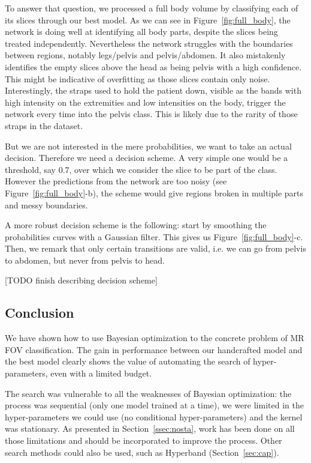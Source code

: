 To answer that question, we processed a full body volume by classifying each of its slices through our best model. 
As we can see in Figure~\ref{fig:full_body}, the network is doing well at identifying all body parts, despite the slices being treated independently. Nevertheless the network struggles with the boundaries between regions, notably legs/pelvis and pelvis/abdomen. It also mistakenly identifies the empty slices above the head as being pelvis with a high confidence. This might be indicative of overfitting as those slices contain only noise. Interestingly, the straps used to hold the patient down, visible as the bands with high intensity on the extremities and low intensities on the body, trigger the network every time into the pelvis class. This is likely due to the rarity of those straps in the dataset.

But we are not interested in the mere probabilities, we want to take an actual decision. Therefore we need a decision scheme. A very simple one would be a threshold, say $0.7$, over which we consider the slice to be part of the class. However the predictions from the network are too noisy (see Figure~\ref{fig:full_body}-b), the scheme would give regions broken in multiple parts and messy boundaries.

A more robust decision scheme is the following: start by smoothing the probabilities curves with a Gaussian filter. This gives us Figure~\ref{fig:full_body}-c. Then, we remark that only certain transitions are valid, i.e. we can go from pelvis to abdomen, but never from pelvis to head.

[TODO finish describing decision scheme]

\subsection{Conclusion}

We have shown how to use Bayesian optimization to the concrete problem of MR FOV classification. The gain in performance between our handcrafted model and the best model clearly shows the value of automating the search of hyper-parameters, even with a limited budget.

The search was vulnerable to all the weaknesses of Bayesian optimization: the process was sequential (only one model trained at a time), we were limited in the hyper-parameters we could use (no conditional hyper-parameters) and the kernel was stationary. As presented in Section~\ref{ssec:nosta}, work has been done on all those limitations and should be incorporated to improve the process. Other search methods could also be used, such as Hyperband (Section~\ref{sec:cap}). 


